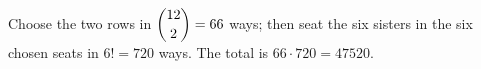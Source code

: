 Choose the two rows in $\dbinom{12}{2}=66$ ways; then seat the six sisters in the six chosen seats in $6!=720$ ways. The total is $66\cdot720=\boxed{47520}$.
